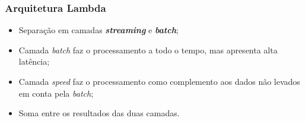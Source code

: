 \begin{frame}
    \frametitle{Arquitetura Lambda}
    \begin{itemize}
        \item Separação em camadas \textbf{\textit{streaming}} e
            \textbf{\textit{batch}};
        \item Camada \textit{batch} faz o processamento a todo o tempo, mas
            apresenta alta latência;
        \item Camada \textit{speed} faz o processamento como complemento aos
            dados não levados em conta pela \textit{batch};
        \item Soma entre os resultados das duas camadas.
    \end{itemize}
\end{frame}
